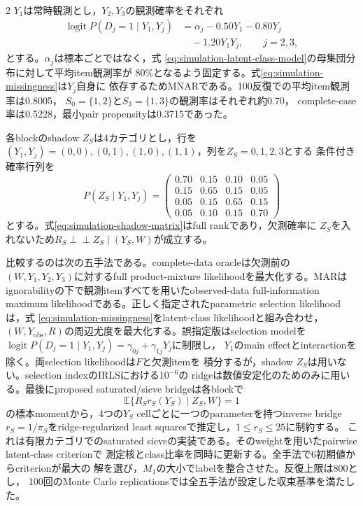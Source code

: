 \documentclass[a4paper,10pt]{article}
\newcommand{\E}{\mathbb E}
\newcommand{\indep}{\mathrel{\perp\!\!\!\perp}}
\begin{document}
\begin{multicols}{2}
$Y_1$は常時観測とし，$Y_2,Y_3$の観測確率をそれぞれ
\begin{equation}
\begin{aligned}
\operatorname{logit}P(D_j=1\mid Y_1,Y_j)
&=\alpha_j-0.50Y_1-0.80Y_j\\
&\quad-1.20Y_1Y_j,\qquad j=2,3,
\end{aligned}
\label{eq:simulation-missingness}
\end{equation}
とする。$\alpha_j$は標本ごとではなく，式
\eqref{eq:simulation-latent-class-model}の母集団分布に対して平均item観測率が
80\%となるよう固定する。式\eqref{eq:simulation-missingness}は$Y_j$自身に
依存するためMNARである。100反復での平均item観測率は0.8005，
$S_0=\{1,2\}$と$S_3=\{1,3\}$の観測率はそれぞれ約0.70，
complete-case率は0.5228，最小pair propensityは0.3715であった。

各blockのshadow $Z_S$は4カテゴリとし，行を
$(Y_1,Y_j)=(0,0),(0,1),(1,0),(1,1)$，列を$Z_S=0,1,2,3$とする
条件付き確率行列を
\begin{equation}
P(Z_S\mid Y_1,Y_j)=
\begin{pmatrix}
0.70&0.15&0.10&0.05\\
0.15&0.65&0.15&0.05\\
0.05&0.15&0.65&0.15\\
0.05&0.10&0.15&0.70
\end{pmatrix}
\label{eq:simulation-shadow-matrix}
\end{equation}
とする。式\eqref{eq:simulation-shadow-matrix}はfull rankであり，欠測確率に
$Z_S$を入れないため$R_S\indep Z_S\mid(Y_S,W)$が成立する。

比較するのは次の五手法である。complete-data oracleは欠測前の
$(W,Y_1,Y_2,Y_3)$に対するfull product-mixture likelihoodを最大化する。MARは
ignorabilityの下で観測itemすべてを用いたobserved-data full-information maximum
likelihoodである。正しく指定されたparametric selection likelihoodは，式
\eqref{eq:simulation-missingness}をlatent-class likelihoodと組み合わせ，
$(W,Y_{\mathrm{obs}},R)$の周辺尤度を最大化する。誤指定版はselection modelを
$\operatorname{logit}P(D_j=1\mid Y_1,Y_j)=\gamma_{0j}+\gamma_{1j}Y_j$に制限し，
$Y_1$のmain effectとinteractionを除く。両selection likelihoodは$F$と欠測itemを
積分するが，shadow $Z_S$は用いない。selection indexのIRLSにおける$10^{-6}$の
ridgeは数値安定化のためのみに用いる。最後にproposed saturated/sieve bridgeは各blockで
\begin{equation}
\E\{R_S r_S(Y_S)\mid Z_S,W\}=1
\label{eq:simulation-bridge-moment}
\end{equation}
の標本momentから，4つの$Y_S$ cellごとに一つのparameterを持つinverse bridge
$r_S=1/\pi_S$をridge-regularized least squaresで推定し，$1\le r_S\le25$に制約する。
これは有限カテゴリでのsaturated sieveの実装である。そのweightを用いたpairwise latent-class criterionで
測定核とclass比率を同時に更新する。全手法で6初期値からcriterionが最大の
解を選び，$M_1$の大小でlabelを整合させた。反復上限は800とし，
100回のMonte Carlo replicationsでは全五手法が設定した収束基準を満たした。


\end{multicols}
\end{document}
